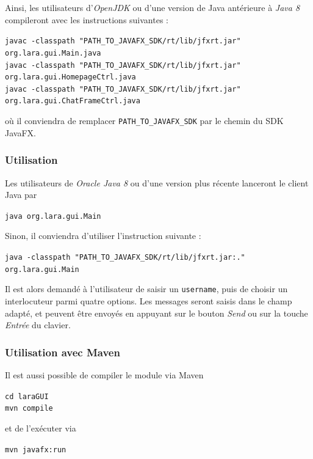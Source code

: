 \documentclass[10pt,a4paper]{article}
\begin{document}
Ainsi, les utilisateurs d'\textit{OpenJDK} ou d'une version de Java antérieure à \textit{Java 8} compileront avec les instructions suivantes :
\begin{center}
    \texttt{javac -classpath "PATH\_TO\_JAVAFX\_SDK/rt/lib/jfxrt.jar" org.lara.gui.Main.java} \\
    \texttt{javac -classpath "PATH\_TO\_JAVAFX\_SDK/rt/lib/jfxrt.jar" org.lara.gui.HomepageCtrl.java} \\
    \texttt{javac -classpath "PATH\_TO\_JAVAFX\_SDK/rt/lib/jfxrt.jar" org.lara.gui.ChatFrameCtrl.java}
\end{center}
où il conviendra de remplacer \texttt{PATH\_TO\_JAVAFX\_SDK} par le chemin du SDK JavaFX. 

\subsubsection{Utilisation}

Les utilisateurs de \textit{Oracle Java 8} ou d'une version plus récente lanceront le client Java par
\begin{center}
    \texttt{java org.lara.gui.Main}
\end{center}

Sinon, il conviendra d'utiliser l'instruction suivante :
\begin{center}
    \texttt{java -classpath "PATH\_TO\_JAVAFX\_SDK/rt/lib/jfxrt.jar:." org.lara.gui.Main}
\end{center}

Il est alors demandé à l'utilisateur de saisir un \texttt{username}, puis de choisir un interlocuteur parmi quatre options. Les messages seront saisis dans le champ adapté, et peuvent être envoyés en appuyant sur le bouton \textit{Send} ou sur la touche \textit{Entrée} du clavier.

\subsubsection{Utilisation avec Maven}
Il est aussi possible de compiler le module via Maven
\begin{center}
\texttt{cd laraGUI} \\
\texttt{mvn compile}
\end{center}
et de l'exécuter via
\begin{center}
\texttt{mvn javafx:run}
\end{center}
\end{document}
